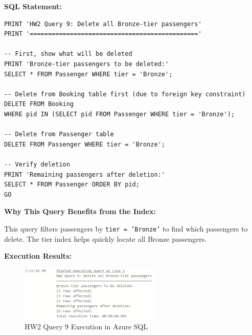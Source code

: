 \documentclass[12pt]{article}
\begin{document}
\textbf{SQL Statement:}
\begin{lstlisting}
PRINT 'HW2 Query 9: Delete all Bronze-tier passengers'
PRINT '=============================================='

-- First, show what will be deleted
PRINT 'Bronze-tier passengers to be deleted:'
SELECT * FROM Passenger WHERE tier = 'Bronze';

-- Delete from Booking table first (due to foreign key constraint)
DELETE FROM Booking 
WHERE pid IN (SELECT pid FROM Passenger WHERE tier = 'Bronze');

-- Delete from Passenger table
DELETE FROM Passenger WHERE tier = 'Bronze';

-- Verify deletion
PRINT 'Remaining passengers after deletion:'
SELECT * FROM Passenger ORDER BY pid;
GO
\end{lstlisting}

\textbf{Why This Query Benefits from the Index:}

This query filters passengers by \texttt{tier = 'Bronze'} to find which passengers to delete. The tier index helps quickly locate all Bronze passengers.

\textbf{Execution Results:}

\begin{figure}[h]
\centering
\includegraphics[width=0.6\textwidth]{../../../Screenshots/Problem2/Query9_Execution.png}
\caption{HW2 Query 9 Execution in Azure SQL}
\label{fig:query9_execution}
\end{figure}
\end{document}

